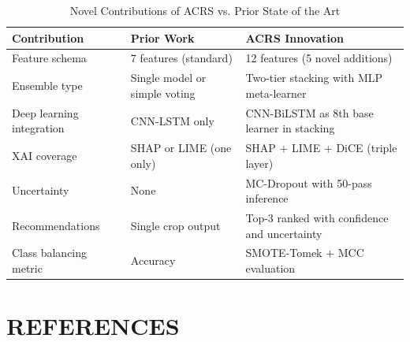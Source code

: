 \documentclass[12pt,a4paper,oneside]{report}
\begin{document}
\begin{table}[H]
\centering
\caption{Novel Contributions of ACRS vs. Prior State of the Art}
\label{tab:contributions}
\renewcommand{\arraystretch}{1.4}
\begin{tabular}{p{5cm} p{3cm} p{5cm}}
\toprule
\textbf{Contribution} & \textbf{Prior Work} & \textbf{ACRS Innovation} \\
\midrule
Feature schema & 7 features (standard) & 12 features (5 novel additions) \\
Ensemble type & Single model or simple voting & Two-tier stacking with MLP meta-learner \\
Deep learning integration & CNN-LSTM only & CNN-BiLSTM as 8th base learner in stacking \\
XAI coverage & SHAP or LIME (one only) & SHAP + LIME + DiCE (triple layer) \\
Uncertainty & None & MC-Dropout with 50-pass inference \\
Recommendations & Single crop output & Top-3 ranked with confidence and uncertainty \\
Class balancing metric & Accuracy & SMOTE-Tomek + MCC evaluation \\
\bottomrule
\end{tabular}
\end{table}

\chapter*{REFERENCES}
\end{document}
